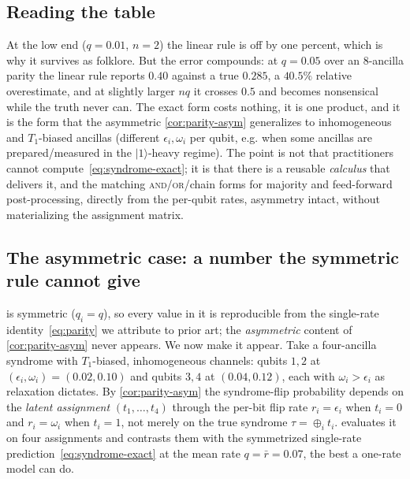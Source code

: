 \documentclass[12pt]{article}
\numberwithin{equation}{section}
\theoremstyle{plain}
\theoremstyle{definition}
\theoremstyle{remark}
\newcommand{\eps}{\epsilon}
\newcommand{\ket}[1]{\lvert #1 \rangle}
\newcommand{\bxor}{\oplus}
\begin{document}
\subsection{Reading the table}

At the low end ($q=0.01$, $n=2$) the linear rule is off by one percent, which is
why it survives as folklore. But the error compounds: at $q=0.05$ over an
$8$-ancilla parity the linear rule reports $0.40$ against a true $0.285$, a
$40.5\%$ relative overestimate, and at slightly larger $nq$ it crosses $0.5$ and
becomes nonsensical while the truth never can. The exact form costs nothing, it
is one product, and it is the form that the asymmetric \cref{cor:parity-asym}
generalizes to inhomogeneous and $T_1$-biased ancillas (different $\eps_i,\omega_i$
per qubit, e.g. when some ancillas are prepared/measured in the $\ket{1}$-heavy
regime). The point is not that practitioners cannot compute~\eqref{eq:syndrome-exact};
it is that there is a reusable \emph{calculus} that delivers it, and the
matching \textsc{and}/\textsc{or}/chain forms for majority and feed-forward
post-processing, directly from the per-qubit rates, asymmetry intact, without
materializing the assignment matrix.

\subsection{The asymmetric case: a number the symmetric rule cannot give}
\label{sec:worked-asym}

 is symmetric ($q_i=q$), so every value in it is reproducible
from the single-rate identity~\eqref{eq:parity} we attribute to prior art; the
\emph{asymmetric} content of \cref{cor:parity-asym} never appears. We now make it
appear. Take a four-ancilla syndrome with $T_1$-biased, inhomogeneous channels:
qubits $1,2$ at $(\eps_i,\omega_i)=(0.02,0.10)$ and qubits $3,4$ at $(0.04,0.12)$,
each with $\omega_i>\eps_i$ as relaxation dictates. By \cref{cor:parity-asym} the
syndrome-flip probability depends on the \emph{latent assignment}
$(t_1,\dots,t_4)$ through the per-bit flip rate $r_i=\eps_i$ when $t_i=0$ and
$r_i=\omega_i$ when $t_i=1$, not merely on the true syndrome $\tau=\bxor_i t_i$.
 evaluates it on four assignments and contrasts them with
the symmetrized single-rate prediction~\eqref{eq:syndrome-exact} at the mean rate
$q=\bar r=0.07$, the best a one-rate model can do.
\end{document}
